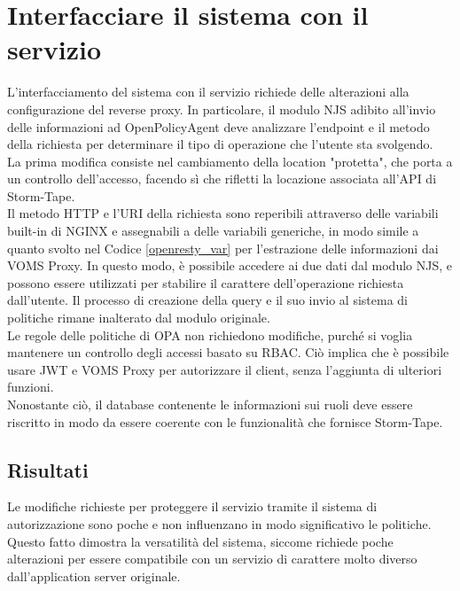 \section{Interfacciare il sistema con il servizio}
L'interfacciamento del sistema con il servizio richiede delle alterazioni alla configurazione del reverse proxy. In particolare, 
il modulo NJS adibito all'invio delle informazioni ad OpenPolicyAgent deve analizzare l'endpoint e il metodo della richiesta per 
determinare il tipo di operazione che l'utente sta svolgendo.
\\ La prima modifica consiste nel cambiamento della location "protetta", che porta a un controllo dell'accesso, 
facendo sì che rifletti la locazione associata all'API di Storm-Tape.  
\\ Il metodo HTTP e l'URI della richiesta sono reperibili attraverso delle variabili built-in di NGINX e assegnabili 
a delle variabili generiche, in modo simile a quanto svolto
nel Codice \ref*{openresty_var} per l'estrazione delle informazioni dai VOMS Proxy. In questo modo, è possibile accedere ai due dati dal modulo NJS,
 e possono essere utilizzati per stabilire il carattere dell'operazione richiesta dall'utente. Il processo di creazione della query e il suo invio al
  sistema di politiche rimane inalterato dal modulo originale. 
\\ Le regole delle politiche di OPA non richiedono modifiche, purché si voglia mantenere un controllo degli accessi basato su RBAC. Ciò implica che è possibile usare JWT e VOMS Proxy 
per autorizzare il client, senza l'aggiunta di ulteriori funzioni. 
\\ Nonostante ciò, il database contenente le informazioni sui ruoli deve essere riscritto in modo da essere coerente con 
le funzionalità che fornisce Storm-Tape. 

\subsection{Risultati}
Le modifiche richieste per proteggere il servizio tramite il sistema di autorizzazione sono poche e 
non influenzano in modo significativo le politiche. Questo fatto dimostra la versatilità del sistema, 
siccome richiede poche alterazioni per essere compatibile con un servizio di carattere molto diverso 
dall'application server originale.   

